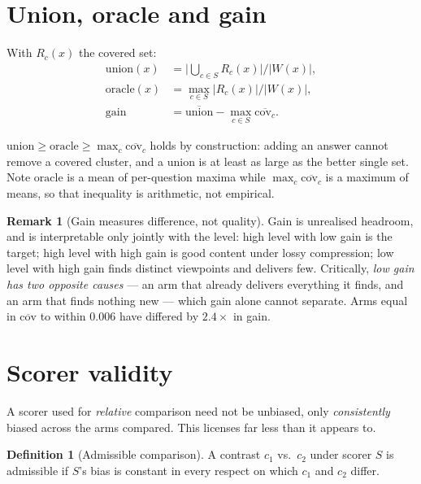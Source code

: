 \documentclass[11pt]{article}
\theoremstyle{definition}
\newtheorem{definition}{Definition}
\newtheorem{remark}{Remark}
\newcommand{\cov}{\mathrm{cov}}
\newcommand{\1}{\mathbf{1}}
\begin{document}
\section{Union, oracle and gain}

With $R_c(x)$ the covered set:
\begin{align*}
  \mathrm{union}(x)  &= \Big|\textstyle\bigcup_{c \in S} R_c(x)\Big| \big/ |W(x)|, \\
  \mathrm{oracle}(x) &= \max_{c \in S} |R_c(x)| \big/ |W(x)|, \\
  \mathrm{gain}      &= \overline{\mathrm{union}} - \max_{c \in S} \overline{\cov_c}.
\end{align*}

$\mathrm{union} \ge \mathrm{oracle} \ge \max_c \overline{\cov_c}$ holds by
construction: adding an answer cannot remove a covered cluster, and a union is at
least as large as the better single set. Note $\mathrm{oracle}$ is a mean of
per-question maxima while $\max_c \overline{\cov_c}$ is a maximum of means, so
that inequality is arithmetic, not empirical.

\begin{remark}[Gain measures difference, not quality]
Gain is unrealised headroom, and is interpretable only jointly with the level:
high level with low gain is the target; high level with high gain is good content
under lossy compression; low level with high gain finds distinct viewpoints and
delivers few. Critically, \emph{low gain has two opposite causes} --- an arm that
already delivers everything it finds, and an arm that finds nothing new --- which
gain alone cannot separate. Arms equal in $\overline{\cov}$ to within $0.006$
have differed by $2.4\times$ in gain.
\end{remark}

\section{Scorer validity}

A scorer used for \emph{relative} comparison need not be unbiased, only
\emph{consistently} biased across the arms compared. This licenses far less than
it appears to.

\begin{definition}[Admissible comparison]
A contrast $c_1$ vs.\ $c_2$ under scorer $S$ is admissible if $S$'s bias is
constant in every respect on which $c_1$ and $c_2$ differ.
\end{definition}
\end{document}
